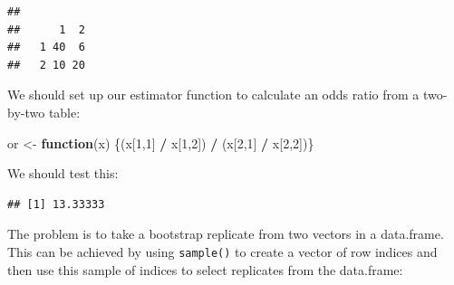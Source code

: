 \documentclass[12pt,a4paper]{book}
\newenvironment{Shaded}{\begin{snugshade}}{\end{snugshade}}
\newcommand{\KeywordTok}[1]{\textcolor[rgb]{0.13,0.29,0.53}{\textbf{#1}}}
\newcommand{\DataTypeTok}[1]{\textcolor[rgb]{0.13,0.29,0.53}{#1}}
\newcommand{\DecValTok}[1]{\textcolor[rgb]{0.00,0.00,0.81}{#1}}
\newcommand{\StringTok}[1]{\textcolor[rgb]{0.31,0.60,0.02}{#1}}
\newcommand{\OtherTok}[1]{\textcolor[rgb]{0.56,0.35,0.01}{#1}}
\newcommand{\ControlFlowTok}[1]{\textcolor[rgb]{0.13,0.29,0.53}{\textbf{#1}}}
\newcommand{\OperatorTok}[1]{\textcolor[rgb]{0.81,0.36,0.00}{\textbf{#1}}}
\newcommand{\NormalTok}[1]{#1}
\theoremstyle{definition}
\theoremstyle{definition}
\theoremstyle{definition}
\theoremstyle{remark}
\begin{document}
\begin{Shaded}
\end{Shaded}

\begin{verbatim}
##    
##      1  2
##   1 40  6
##   2 10 20
\end{verbatim}

We should set up our estimator function to calculate an odds ratio from
a two-by-two table:

\begin{Shaded}
\begin{Highlighting}[]
\NormalTok{or <-}\StringTok{ }\ControlFlowTok{function}\NormalTok{(x) \{(x[}\DecValTok{1}\NormalTok{,}\DecValTok{1}\NormalTok{] }\OperatorTok{/}\StringTok{ }\NormalTok{x[}\DecValTok{1}\NormalTok{,}\DecValTok{2}\NormalTok{]) }\OperatorTok{/}\StringTok{ }\NormalTok{(x[}\DecValTok{2}\NormalTok{,}\DecValTok{1}\NormalTok{] }\OperatorTok{/}\StringTok{ }\NormalTok{x[}\DecValTok{2}\NormalTok{,}\DecValTok{2}\NormalTok{])\}}
\end{Highlighting}
\end{Shaded}

We should test this:

\begin{Shaded}
\end{Shaded}

\begin{verbatim}
## [1] 13.33333
\end{verbatim}

The problem is to take a bootstrap replicate from two vectors in a
data.frame. This can be achieved by using \texttt{sample()} to create a
vector of row indices and then use this sample of indices to select
replicates from the data.frame:
\end{document}
